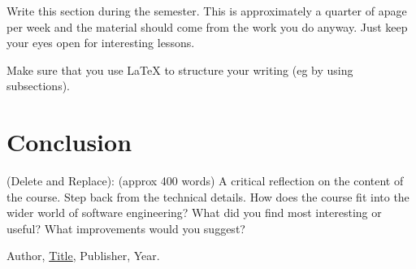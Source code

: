 \documentclass{article}
\theoremstyle{theorem}
\theoremstyle{definition}
\theoremstyle{remark}
\begin{document}
Write this section during the semester. This is approximately a quarter of apage per week and the material should come from the work you do anyway. Just keep your eyes open for interesting lessons.

Make sure that you use \LaTeX{} to structure your writing (eg by using subsections).

\section{Conclusion}\label{conclusion}

(Delete and Replace): (approx 400 words) A critical reflection on the content of the course. Step back from the technical details. How does the course fit into the wider world of software engineering? What did you find most interesting or useful? What improvements would you suggest?

\begin{thebibliography}{99}
 Author, \href{https://en.wikipedia.org/wiki/LaTeX}{Title}, Publisher, Year.
\end{thebibliography}
\end{document}
